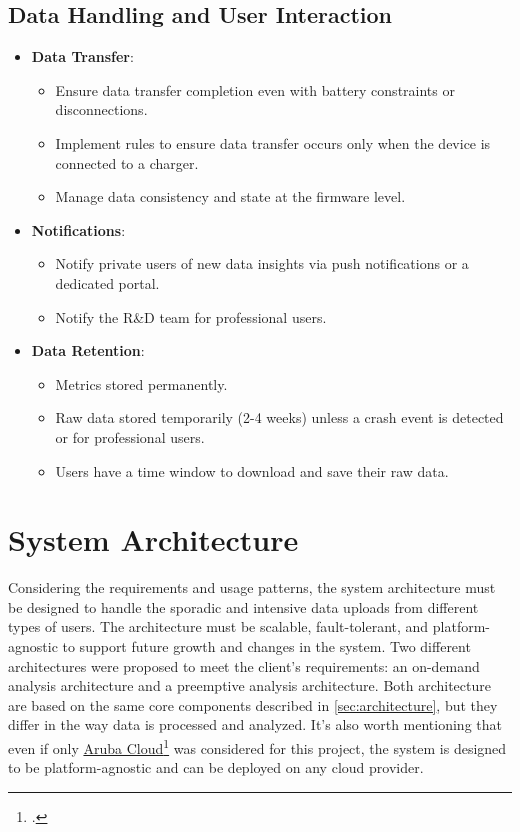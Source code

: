 \subsection*{Data Handling and User Interaction}
\begin{itemize}
    \item \textbf{Data Transfer}:
    \begin{itemize}
        \item Ensure data transfer completion even with battery constraints or disconnections.
        \item Implement rules to ensure data transfer occurs only when the device is connected to a charger.
        \item Manage data consistency and state at the firmware level.
    \end{itemize}
    \item \textbf{Notifications}:
    \begin{itemize}
        \item Notify private users of new data insights via push notifications or a dedicated portal.
        \item Notify the R\&D team for professional users.
    \end{itemize}
    \item \textbf{Data Retention}:
    \begin{itemize}
        \item Metrics stored permanently.
        \item Raw data stored temporarily (2-4 weeks) unless a crash event is detected or for professional users.
        \item Users have a time window to download and save their raw data.
    \end{itemize}
\end{itemize}

\section{System Architecture}
\label{sec:system_architecture}
Considering the requirements and usage patterns, the system architecture must be designed to handle the sporadic and intensive data uploads from different types of users. The architecture must be scalable, fault-tolerant, and platform-agnostic to support future growth and changes in the system. Two different architectures were proposed to meet the client's requirements: an on-demand analysis architecture and a preemptive analysis architecture. Both architecture are based on the same core components described in \ref{sec:architecture}, but they differ in the way data is processed and analyzed.
It's also worth mentioning that even if only \href{https://www.arubacloud.com/}{Aruba Cloud}\footcite{site:aruba-cloud} was considered for this project, the system is designed to be platform-agnostic and can be deployed on any cloud provider.

